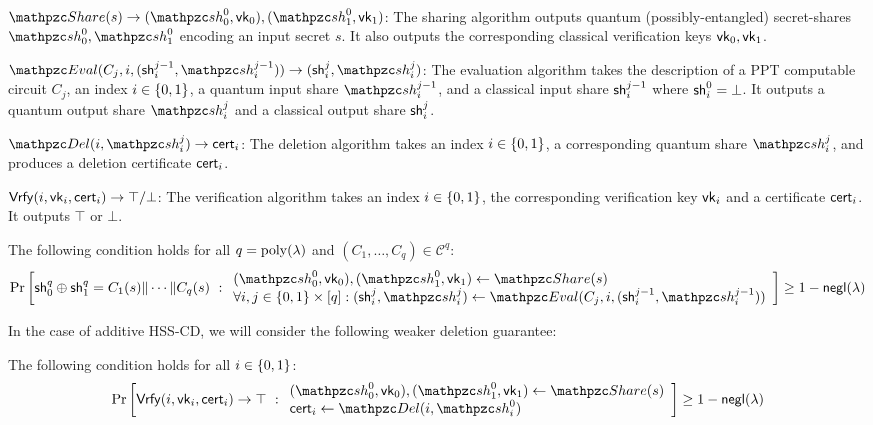 \begin{description}

\item [Syntax:] $ $
\item $\Sh(s) \rightarrow (\qsh_0^0, \vk_0), (\qsh_1^0,
\vk_1)$: The sharing algorithm outputs quantum
(possibly-entangled) secret-shares $\qsh_0^0, \qsh_1^0$ encoding an
input secret $s$. It also outputs the corresponding classical
verification keys $\mathsf{vk}_0, \mathsf{vk}_1$.

\item $\Ev(C_j, i, (\sh_i^{j-1}, \qsh_i^{j-1})) \rightarrow
(\sh_i^j, \qsh_i^{j})$: The
evaluation algorithm takes the description of a PPT computable
circuit $C_j$, an index $i \in \{0,1\}$, a quantum input share
$\qsh_i^{j-1}$, and a classical input share $\mathsf{sh}_i^{j-1}$ where
$\mathsf{sh}_i^0 = \bot$. It outputs a quantum output share $\qsh_i^j$ and a
classical output share $\mathsf{sh}_i^j$.

\item $\Del(i, \qsh_i^j) \rightarrow \cert_i$: The deletion
algorithm takes an index $i \in \{0,1\}$, a corresponding quantum share
$\qsh_i^j$, and produces a deletion certificate $\mathsf{cert}_i$.

\item $\mathsf{Vrfy}(i, \mathsf{vk}_i, \mathsf{cert}_i) \rightarrow \top/\bot$: The
verification algorithm takes an index $i \in \{0,1\}$, the
corresponding verification key $\mathsf{vk}_i$ and a certificate $\mathsf{cert}_i$.
It outputs $\top$ or $\bot$.

\item [Evaluation Correctness:] The following
condition holds for all $q = {\mathrm{poly}}(\lambda)$ and $(C_1, \ldots, C_q)
\in \mathcal{C}^q$:
\begin{align}
\Pr\left[
\sh_0^q \xor \sh_1^q = C_1(s)\| \cdots \| C_q(s)
\ :
\begin{array}{ll}
(\qsh_0^0, \vk_0), (\qsh_1^0, \vk_1) \gets \Sh(s)\\
\forall i,j \in \bit \times [q]: (\sh_i^j, \qsh_i^j)
\leftarrow \Ev(C_j, i,
(\sh_i^{j-1}, \qsh_i^{j-1}))\\
\end{array}
\right] \geq 1 - \negl(\secp)
\end{align}

In the case of additive HSS-CD, we will consider the following
weaker deletion guarantee: 

\item [Delete-before-Eval Correctness:] The following condition
holds for all $i \in \{0,1\}$:
\begin{align}
\Pr\left[
\Vrfy(i, \vk_i, \cert_i) \rightarrow \top
\ :
\begin{array}{ll}
(\qsh_0^0, \vk_0), (\qsh_1^0, \vk_1) \gets \Sh(s)\\
\cert_i \leftarrow \Del(i, \qsh_i^0)
\end{array}
\right] \geq 1 - \negl(\secp)
\end{align}


\end{description}
